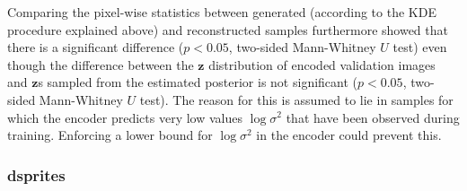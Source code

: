 Comparing the pixel-wise statistics between generated (according to the \ac{KDE} procedure explained above) and reconstructed samples furthermore showed that there is a significant difference ($p < 0.05$, two-sided Mann-Whitney $U$ test) even though the difference between the $\bm{z}$ distribution of encoded validation images and $\bm{z}$s sampled from the estimated posterior is not significant ($p < 0.05$, two-sided Mann-Whitney $U$ test).
The reason for this is assumed to lie in samples for which the encoder predicts very low values $\log \sigma^2$ that have been observed during training.
Enforcing a lower bound for $\log \sigma^2$ in the encoder could prevent this.

\subsubsection{dsprites}

